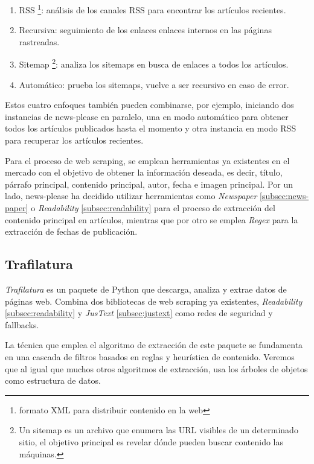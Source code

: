 \begin{enumerate}
  \item RSS \footnote{formato XML para distribuir contenido en la web}: análisis de los canales RSS para 
  encontrar los artículos recientes.
  \item Recursiva: seguimiento de los enlaces enlaces internos en las páginas rastreadas.
  \item Sitemap \footnote{Un sitemap es un archivo que enumera las URL visibles de un determinado sitio, 
  el objetivo principal es revelar dónde pueden buscar contenido las máquinas.}: analiza los sitemaps en 
  busca de enlaces a todos los artículos.
  \item Automático: prueba los sitemaps, vuelve a ser recursivo en caso de error.
\end{enumerate}

Estos cuatro enfoques también pueden combinarse, por ejemplo, iniciando dos instancias de news-please en 
paralelo, una en modo automático para obtener todos los artículos publicados hasta el momento y otra 
instancia en modo RSS para recuperar los artículos recientes.

Para el proceso de web scraping, se emplean herramientas ya existentes en el mercado con el objetivo de 
obtener la información deseada, es decir, título, párrafo principal, contenido principal, autor, fecha e 
imagen principal. Por un lado, news-please ha decidido utilizar herramientas como \emph{Newspaper} 
\ref{subsec:news-paper} o \emph{Readability} \ref{subsec:readability} para el proceso de extracción del 
contenido principal en artículos, mientras que por otro se emplea \emph{Regex} para la extracción de fechas 
de publicación.

\subsection{Trafilatura}
\label{subsec:trafilatura}

\emph{Trafilatura} \cite{trafilatura} es un paquete de Python que descarga, analiza y extrae datos de páginas
web. Combina dos bibliotecas de web scraping ya existentes, \emph{Readability} \ref{subsec:readability} y
\emph{JusText} \ref{subsec:justext} como redes de seguridad y fallbacks.

La técnica que emplea el algoritmo de extracción de este paquete se fundamenta en una cascada de filtros
basados en reglas y heurística de contenido. Veremos que al igual que muchos otros algoritmos de extracción,
usa los árboles de objetos como estructura de datos.


